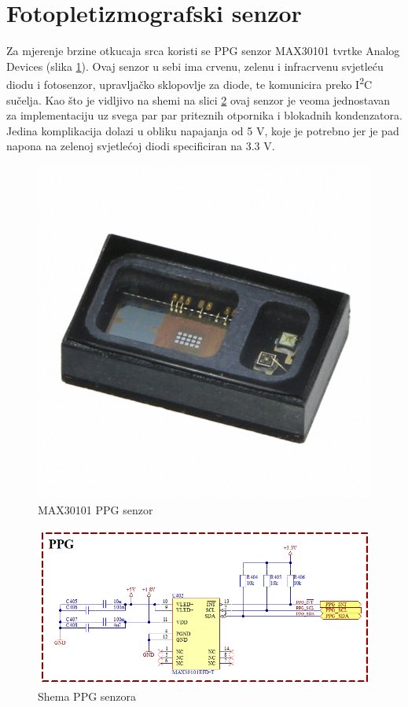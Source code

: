 \newpage
\section{Fotopletizmografski senzor}

Za mjerenje brzine otkucaja srca koristi se PPG senzor MAX30101 tvrtke Analog Devices (slika \ref{slk:MAX30101}). Ovaj senzor u sebi ima crvenu, zelenu i infracrvenu svjetleću diodu i fotosenzor, upravljačko sklopovlje za diode, te komunicira preko I\textsuperscript{2}C sučelja. Kao što je vidljivo na shemi na slici \ref{slk:PPG} ovaj senzor je veoma jednostavan za implementaciju uz svega par par priteznih otpornika i blokadnih kondenzatora. Jedina komplikacija dolazi u obliku napajanja od 5 V, koje je potrebno jer je pad napona na zelenoj svjetlećoj diodi specificiran na 3.3 V.
\begin{figure}[htb]
    \centering
    \includegraphics[width=6 cm]{Figures/MAX30101.JPG}
    \caption{MAX30101 PPG senzor}
    \label{slk:MAX30101}
\end{figure}
\begin{figure}[htb]
    \centering
    \includegraphics[width=\textwidth]{Figures/PPG.png}
    \caption{Shema PPG senzora}
    \label{slk:PPG}
\end{figure}

